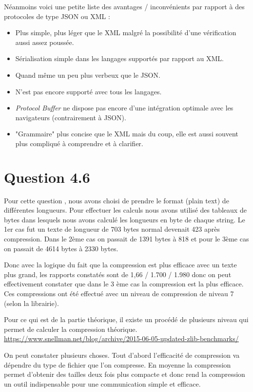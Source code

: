 \documentclass[12pt]{article}
\begin{document}
\begin{enumerate}[leftmargin=*, label=\alph*)]
Néanmoins voici une petite liste des avantages / inconvénients par rapport à des protocoles de type JSON ou XML : 

\begin{itemize}
\item Plus simple, plus léger que le XML malgré la possibilité d'une vérification aussi assez poussée.
\medskip
\item Sérialisation simple dans les langages supportés par rapport au XML.
\medskip
\item Quand même un peu plus verbeux que le JSON.
\medskip
\item N'est pas encore supporté avec tous les langages.
\medskip
\item \emph{Protocol Buffer} ne dispose pas encore d'une intégration optimale avec les navigateurs (contrairement à JSON).
\medskip
\item "Grammaire" plus concise que le XML mais du coup, elle est aussi souvent plus compliqué à comprendre et à clarifier.
\end{itemize}

\end{enumerate}

\section*{Question 4.6}
Pour cette question , nous avons choisi de prendre le format (plain text) de différentes longueurs.
Pour effectuer les calculs nous avons utilisé des tableaux de bytes dans lesquels nous avons calculé les longueurs en byte de chaque string.
Le 1er cas fut un texte de longueur de 703 bytes normal devenait 423 après compression.
Dans le 2ème cas on passait de 1391 bytes à 818 et pour le 3ème cas on passait de 4614 bytes à 2330 bytes.

Donc avec la logique du fait que la compression est plus efficace avec un texte plus grand,
les rapports constatés sont de 1,66 / 1.700 / 1.980 donc on peut effectivement constater que dans le 3 ème cas la
compression est la plus efficace. Ces compressions ont été effectué avec un niveau de compression de niveau 7 (selon la librairie).

Pour ce qui est de la partie théorique, il existe un procédé de plusieurs niveau qui permet de calculer la compression théorique.
\newline
\url{https://www.snellman.net/blog/archive/2015-06-05-updated-zlib-benchmarks/}

On peut constater plusieurs choses. Tout d'abord l'efficacité de compression va dépendre du type de fichier que l'on compresse. 
\newline
En moyenne la compression permet d'obtenir des tailles deux fois plus compacte et donc rend la compression un outil indispensable pour une communication simple et efficace.
\end{document}
